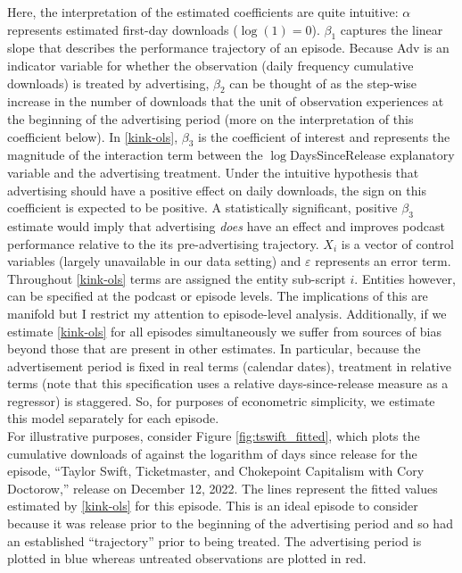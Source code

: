 \documentclass[11pt, letterpaper, twoside]{article}
\begin{document}
Here, the interpretation of the estimated coefficients are quite intuitive: $\alpha$ represents estimated first-day downloads ($\log(1)=0$). $\beta_1$ captures the linear slope that describes the performance trajectory of an episode. Because Adv is an indicator variable for whether the observation (daily frequency cumulative downloads) is treated by advertising, $\beta_2$ can be thought of as the step-wise increase in the number of downloads that the unit of observation experiences at the beginning of the advertising period (more on the interpretation of this coefficient below). In \eqref{kink-ols}, $\beta_3$ is the coefficient of interest and represents the magnitude of the interaction term between the $\log$DaysSinceRelease explanatory variable and the advertising treatment. Under the intuitive hypothesis that advertising should have a positive effect on daily downloads, the sign on this coefficient is expected to be positive. A statistically significant, positive $\beta_3$ estimate would imply that advertising \textit{does} have an effect and improves podcast performance relative to the its pre-advertising trajectory. $X_i$ is a vector of control variables (largely unavailable in our data setting) and $\varepsilon$ represents an error term.\\

Throughout \eqref{kink-ols} terms are assigned the entity sub-script $i$. Entities however, can be specified at the podcast or episode levels. The implications of this are manifold but I restrict my attention to episode-level analysis. Additionally, if we estimate \eqref{kink-ols} for all episodes simultaneously we suffer from sources of bias beyond those that are present in other estimates. In particular, because the advertisement period is fixed in real terms (calendar dates), treatment in relative terms (note that this specification uses a relative days-since-release measure as a regressor) is staggered. So, for purposes of econometric simplicity, we estimate this model separately for each episode.\\

For illustrative purposes, consider Figure \ref{fig:tswift_fitted}, which plots the cumulative downloads of against the logarithm of days since release for the episode, ``Taylor Swift, Ticketmaster, and Chokepoint Capitalism with Cory Doctorow,'' release on December 12, 2022. The lines represent the fitted values estimated by \eqref{kink-ols} for this episode. This is an ideal episode to consider because it was release prior to the beginning of the advertising period and so had an established ``trajectory'' prior to being treated. The advertising period is plotted in blue whereas untreated observations are plotted in red.\\
 
\end{document}
